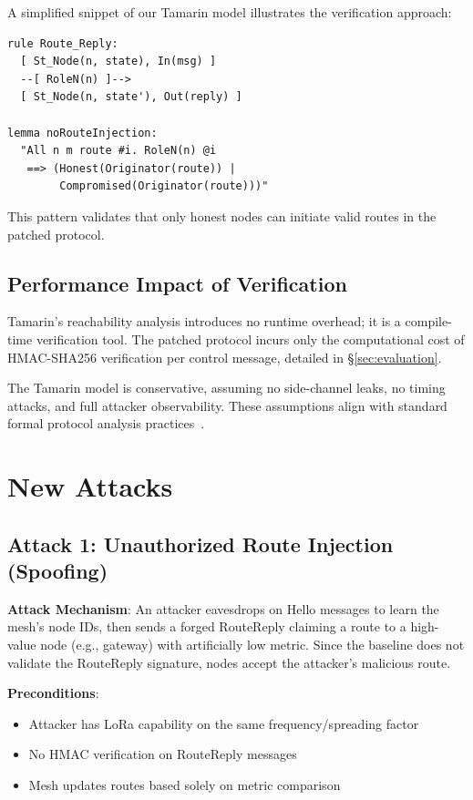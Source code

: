 \documentclass[10pt,journal]{IEEEtran}
\begin{document}
A simplified snippet of our Tamarin model illustrates the verification approach:
\begin{verbatim}
rule Route_Reply:
  [ St_Node(n, state), In(msg) ]
  --[ RoleN(n) ]-->
  [ St_Node(n, state'), Out(reply) ]

lemma noRouteInjection:
  "All n m route #i. RoleN(n) @i 
   ==> (Honest(Originator(route)) | 
        Compromised(Originator(route)))"
\end{verbatim}

This pattern validates that only honest nodes can initiate valid routes in the patched protocol.

\subsection{Performance Impact of Verification}

Tamarin's reachability analysis introduces no runtime overhead; it is a compile-time verification tool. The patched protocol incurs only the computational cost of HMAC-SHA256 verification per control message, detailed in §\ref{sec:evaluation}.

The Tamarin model is conservative, assuming no side-channel leaks, no timing attacks, and full attacker observability. These assumptions align with standard formal protocol analysis practices~\cite{ieee2025-adr-eventb,ieee2025-lorawan-key-vulnerability}.

\section{New Attacks}

\subsection{Attack 1: Unauthorized Route Injection (Spoofing)}

\textbf{Attack Mechanism}: An attacker eavesdrops on Hello messages to learn the mesh's node IDs, then sends a forged RouteReply claiming a route to a high-value node (e.g., gateway) with artificially low metric. Since the baseline does not validate the RouteReply signature, nodes accept the attacker's malicious route.

\textbf{Preconditions}:
\begin{itemize}
	\item Attacker has LoRa capability on the same frequency/spreading factor
	\item No HMAC verification on RouteReply messages
	\item Mesh updates routes based solely on metric comparison
\end{itemize}
\end{document}
